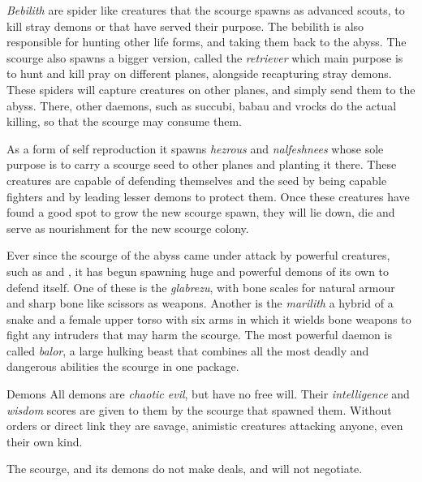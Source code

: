 \emph{Bebilith} are spider like creatures that the scourge spawns as advanced
scouts, to kill stray demons or that have served their purpose. The bebilith
is also responsible for hunting other life forms, and taking them back to the
abyss. The scourge also spawns a bigger version, called the \emph{retriever}
which main purpose is to hunt and kill pray on different planes, alongside
recapturing stray demons. These spiders will capture creatures on other planes,
and simply send them to the abyss. There, other daemons, such as succubi,
babau and vrocks do the actual killing, so that the scourge may consume them.

As a form of self reproduction it spawns \emph{hezrous} and \emph{nalfeshnees}
whose sole purpose is to carry a scourge seed to other planes and planting
it there. These creatures are capable of defending themselves and the seed
by being capable fighters and by leading lesser demons to protect them. Once
these creatures have found a good spot to grow the new scourge spawn, they
will lie down, die and serve as nourishment for the new scourge colony.

Ever since the scourge of the abyss came under attack by powerful creatures,
such as  and , it has begun spawning
huge and powerful demons of its own to defend itself. One of these is the
\emph{glabrezu}, with bone scales for natural armour and sharp bone like
scissors as weapons. Another is the \emph{marilith} a hybrid of a snake and
a female upper torso with six arms in which it wields bone weapons to fight
any intruders that may harm the scourge. The most powerful daemon is called
\emph{balor}, a large hulking beast that combines all the most deadly and
dangerous abilities the scourge in one package.

\begin{35e}{Demons}
  All demons are \emph{chaotic evil}, but have no free will. Their
  \emph{intelligence} and \emph{wisdom} scores are given to them by the
  scourge that spawned them. Without orders or direct link they are savage,
  animistic creatures attacking anyone, even their own kind.

  The scourge, and its demons do not make deals, and will not negotiate.
\end{35e}

